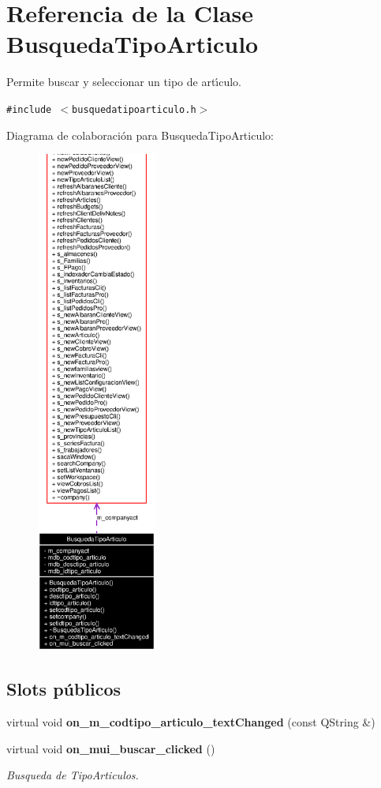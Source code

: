 \section{Referencia de la Clase Busqueda\-Tipo\-Articulo}
\label{classBusquedaTipoArticulo}
Permite buscar y seleccionar un tipo de art\'{\i}culo.  


{\tt \#include $<$busquedatipoarticulo.h$>$}

Diagrama de colaboraci\'{o}n para Busqueda\-Tipo\-Articulo:\begin{figure}[H]
\begin{center}
\leavevmode
\includegraphics[width=112pt]{classBusquedaTipoArticulo__coll__graph}
\end{center}
\end{figure}
\subsection*{Slots p\'{u}blicos}
\begin{CompactItemize}
\item 
virtual void {\bf on\_\-m\_\-codtipo\_\-articulo\_\-text\-Changed} (const QString \&)\label{classBusquedaTipoArticulo_i0}

\item 
virtual void {\bf on\_\-mui\_\-buscar\_\-clicked} ()\label{classBusquedaTipoArticulo_i1}

\begin{CompactList}\small\item\em Busqueda de Tipo\-Articulos. \item\end{CompactList}\end{CompactItemize}
